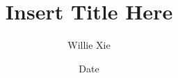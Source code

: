 \documentclass[a4paper,12pt]{article}
\title{\huge Insert Title Here}
\author{\LARGE Willie Xie}
\date{\Large Date}
\begin{document}
    \maketitle
    \newpage
	{ \large \tableofcontents }

		

    
\end{document}
